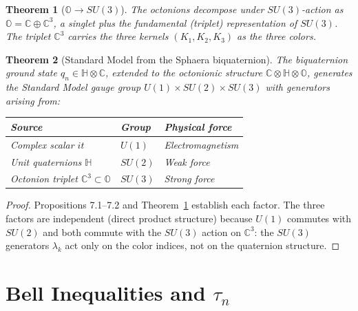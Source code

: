 \documentclass[12pt,a4paper]{article}
\newtheorem{theorem}{Theorem}[section]
\newcommand{\HH}{\mathbb{H}}
\newcommand{\OO}{\mathbb{O}}
\begin{document}
\begin{theorem}[$\OO\to SU(3)$]\label{thm:octonion-SU3}
The octonions decompose under $SU(3)$-action as
$\OO = \mathbb{C}\oplus\mathbb{C}^3$,
a singlet plus the fundamental (triplet) representation of $SU(3)$.
The triplet $\mathbb{C}^3$ carries the three kernels $(K_1,K_2,K_3)$
as the three colors.
\end{theorem}

\begin{theorem}[Standard Model from the Sphaera biquaternion]\label{thm:SM}
The biquaternion ground state $q_n\in\HH\otimes\mathbb{C}$, extended to
the octonionic structure $\mathbb{C}\otimes\HH\otimes\OO$, generates
the Standard Model gauge group $U(1)\times SU(2)\times SU(3)$ with
generators arising from:
\begin{center}
\renewcommand{\arraystretch}{1.3}
\begin{tabular}{lll}
\toprule
Source & Group & Physical force\\
\midrule
Complex scalar $it$ & $U(1)$ & Electromagnetism\\
Unit quaternions $\HH$ & $SU(2)$ & Weak force\\
Octonion triplet $\mathbb{C}^3\subset\OO$ & $SU(3)$ & Strong force\\
\bottomrule
\end{tabular}
\end{center}
\end{theorem}

\begin{proof}
Propositions 7.1--7.2 and Theorem~\ref{thm:octonion-SU3} establish each
factor.
The three factors are independent (direct product structure) because
$U(1)$ commutes with $SU(2)$ and both commute with the $SU(3)$ action
on $\mathbb{C}^3$: the $SU(3)$ generators $\lambda_k$ act only on the
color indices, not on the quaternion structure.
\end{proof}


\section{Bell Inequalities and \texorpdfstring{$\tau_n$}{tau_n}}
\label{sec:bell}
\end{document}
